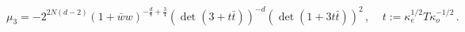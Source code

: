 \begin{equation}
\mu _{3}=-2^{2N(d-2)}(1+\bar{w}w)^{-{\frac{d}{8}}+{\frac{3}{4}}}(\det (3+t%
\bar{t}))^{-d}(\det (1+3t\bar{t}))^{2}\,,~~~~~t:=\kappa
_{e}^{1/2}T\kappa _{o}^{-1/2}\,.  \label{normalization}
\end{equation}

